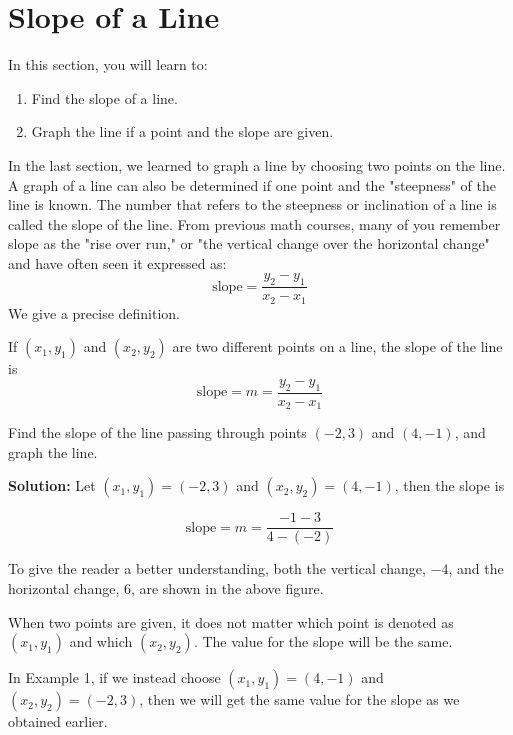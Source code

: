 

\section{Slope of a Line}

In this section, you will learn to:
\begin{enumerate}
    \item Find the slope of a line.
    \item Graph the line if a point and the slope are given.
\end{enumerate}

In the last section, we learned to graph a line by choosing two points on the line. A graph of a line can also be determined if one point and the "steepness" of the line is known. The number that refers to the steepness or inclination of a line is called the slope of the line. From previous math courses, many of you remember slope as the "rise over run," or "the vertical change over the horizontal change" and have often seen it expressed as:
\[
\text{slope} = \frac{{y_2 - y_1}}{{x_2 - x_1}}
\]
We give a precise definition.

\begin{definition} If \((x_1, y_1)\) and \((x_2, y_2)\) are two different points on a line, the slope of the line is
\[
\text{slope} = m = \frac{{y_2 - y_1}}{{x_2 - x_1}}
\]
\end{definition}

\begin{example}
Find the slope of the line passing through points \((-2, 3)\) and \((4, -1)\), and graph the line.
\end{example}

\textbf{Solution:} Let \((x_1, y_1) = (-2, 3)\) and \((x_2, y_2) = (4, -1)\), then the slope is

\[
\text{slope} = m = \frac{{-1 - 3}}{{4 - (-2)}}
\]

To give the reader a better understanding, both the vertical change, \(-4\), and the horizontal change, \(6\), are shown in the above figure.

When two points are given, it does not matter which point is denoted as \((x_1, y_1)\) and which \((x_2, y_2)\). The value for the slope will be the same.

In Example 1, if we instead choose \((x_1, y_1) = (4, -1)\) and \((x_2, y_2) = (-2, 3)\), then we will get the same value for the slope as we obtained earlier.

